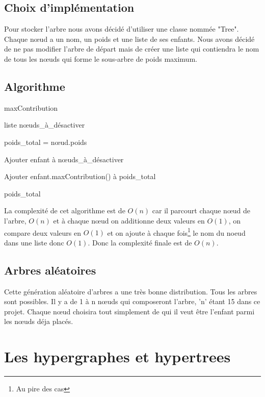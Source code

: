 \documentclass{article}
\begin{document}
	\subsection{Choix d'implémentation}

		Pour stocker l'arbre nous avons décidé d'utiliser une classe nommée "Tree". Chaque nœud a un nom, un poids et une liste de ses enfants. Nous avons décidé de ne pas modifier l'arbre de départ mais de créer une liste qui contiendra le nom de tous les nœuds qui forme le sous-arbre de poids maximum.
	
		\subsection{Algorithme}
		
		\begin{algorithm}[H]
		\caption{maxContribution}
		\begin{algorithmic}[1]
		\REQUIRE liste nœuds\_à\_désactiver

		\STATE poids\_total = nœud.poids
	
	
		\STATE Ajouter enfant à nœuds\_à\_désactiver

		\ELSE
		\STATE Ajouter enfant.maxContribution() à poids\_total
	
		\ENDIF	
		\ENDFOR

		\RETURN poids\_total

		\end{algorithmic}
		\end{algorithm}
	
		La complexité de cet algorithme est de $O(n)$ car il parcourt chaque nœud de l'arbre, $O(n)$ et à chaque nœud on additionne deux valeurs en $O(1)$, on compare deux valeurs en $O(1)$ et on ajoute à chaque fois\footnote{Au pire des cas} le nom du noeud dans une liste donc $O(1)$. Donc la complexité finale est de $O(n)$.
		
	\subsection{Arbres aléatoires}
	Cette génération aléatoire d'arbres a une très bonne distribution. Tous les arbres sont possibles. Il y a  de 1 à n nœuds qui composeront l'arbre, 'n' étant 15 dans ce projet. Chaque nœud choisira tout simplement de qui il veut être l'enfant parmi les nœuds déja placés.
	
\section{Les hypergraphes et hypertrees}
\end{document}
